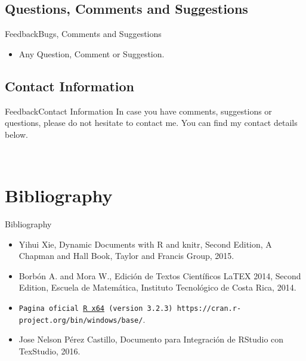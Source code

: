 \documentclass[10pt]{beamer}
\newcommand{\chref}[2]{%
  \href{#1}{{\usebeamercolor[bg]{AAUsidebar}#2}}%
}
\begin{document}
\subsection{Questions, Comments and Suggestions}
\begin{frame}{Feedback}{Bugs, Comments and Suggestions}
  \begin{itemize}
    \item<1-> Any Question, Comment or Suggestion.
  \end{itemize}
\end{frame}

\subsection{Contact Information}
\begin{frame}{Feedback}{Contact Information}
In case you have comments, suggestions or questions, please do not hesitate to contact me. You can find my contact details below.
  \begin{center}
    \insertauthor\\
  \end{center}
\end{frame}

\section{Bibliography}
\begin{frame}{Bibliography}{}

	\begin{itemize}
		\item<1->Yihui Xie, Dynamic Documents with R and knitr, Second Edition, A Chapman and Hall Book, Taylor and Francis Group, 2015.
		\item<1->Borbón A. and Mora W., Edición de Textos Científicos LaTEX 2014, Second Edition, Escuela de Matemática, Instituto Tecnológico de Costa Rica, 2014. 
		\item<1->{\tt Pagina oficial \chref{https://cran.r-project.org/bin/windows/base/}{R x64} (version 3.2.3) https://cran.r-project.org/bin/windows/base/}.
		\item<1->Jose Nelson Pérez Castillo, Documento para Integración de RStudio con TexStudio, 2016.
	\end{itemize}
\end{frame}




{\aauwavesbg
\begin{frame}
\end{frame}}
\end{document}
